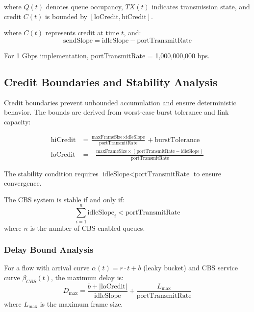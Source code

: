 \documentclass[10pt, journal, compsoc]{IEEEtran}
\begin{document}
where $Q(t)$ denotes queue occupancy, $TX(t)$ indicates transmission state, and credit $C(t)$ is bounded by $[\text{loCredit}, \text{hiCredit}]$.

where $C(t)$ represents credit at time $t$, and:
\begin{equation}
\text{sendSlope} = \text{idleSlope} - \text{portTransmitRate}
\end{equation}

For 1 Gbps implementation, portTransmitRate = 1,000,000,000 bps.

\subsection{Credit Boundaries and Stability Analysis}

Credit boundaries prevent unbounded accumulation and ensure deterministic behavior. The bounds are derived from worst-case burst tolerance and link capacity:

\begin{align}
\text{hiCredit} &= \frac{\text{maxFrameSize} \times \text{idleSlope}}{\text{portTransmitRate}} + \text{burstTolerance} \\
\text{loCredit} &= -\frac{\text{maxFrameSize} \times (\text{portTransmitRate} - \text{idleSlope})}{\text{portTransmitRate}}
\end{align}

The stability condition requires $\text{idleSlope} < \text{portTransmitRate}$ to ensure convergence.

\begin{lemma}
The CBS system is stable if and only if:
\begin{equation}
\sum_{i=1}^{n} \text{idleSlope}_i < \text{portTransmitRate}
\end{equation}
where $n$ is the number of CBS-enabled queues.
\end{lemma}

\subsubsection{Delay Bound Analysis}

\begin{theorem}
For a flow with arrival curve $\alpha(t) = r \cdot t + b$ (leaky bucket) and CBS service curve $\beta_{CBS}(t)$, the maximum delay is:
\begin{equation}
D_{\max} = \frac{b + |\text{loCredit}|}{\text{idleSlope}} + \frac{L_{\max}}{\text{portTransmitRate}}
\end{equation}
where $L_{\max}$ is the maximum frame size.
\end{theorem}
\end{document}
